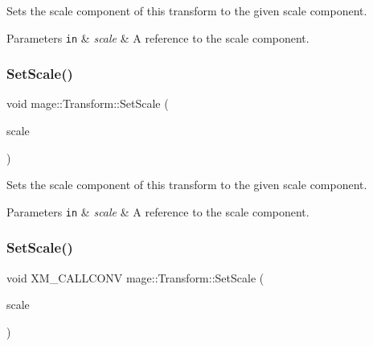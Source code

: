 Sets the scale component of this transform to the given scale component.


\begin{DoxyParams}[1]{Parameters}
\mbox{\tt in}  & {\em scale} & A reference to the scale component. \\
\hline
\end{DoxyParams}
\hypertarget{structmage_1_1_transform_a06ec78f9239c0f0663638359f4f3c3b8}{}\label{structmage_1_1_transform_a06ec78f9239c0f0663638359f4f3c3b8} 
\subsubsection{\texorpdfstring{Set\+Scale()}{SetScale()}\hspace{0.1cm}{\footnotesize\ttfamily [4/5]}}
{\footnotesize\ttfamily void mage\+::\+Transform\+::\+Set\+Scale (\begin{DoxyParamCaption}\item[{X\+M\+F\+L\+O\+A\+T3 \&\&}]{scale }\end{DoxyParamCaption})\hspace{0.3cm}{\ttfamily [noexcept]}}

Sets the scale component of this transform to the given scale component.


\begin{DoxyParams}[1]{Parameters}
\mbox{\tt in}  & {\em scale} & A reference to the scale component. \\
\hline
\end{DoxyParams}
\hypertarget{structmage_1_1_transform_a7dd2ca0ee43f956f1a6db79f83c14983}{}\label{structmage_1_1_transform_a7dd2ca0ee43f956f1a6db79f83c14983} 
\subsubsection{\texorpdfstring{Set\+Scale()}{SetScale()}\hspace{0.1cm}{\footnotesize\ttfamily [5/5]}}
{\footnotesize\ttfamily void X\+M\+\_\+\+C\+A\+L\+L\+C\+O\+NV mage\+::\+Transform\+::\+Set\+Scale (\begin{DoxyParamCaption}\item[{F\+X\+M\+V\+E\+C\+T\+OR}]{scale }\end{DoxyParamCaption})\hspace{0.3cm}{\ttfamily [noexcept]}}

